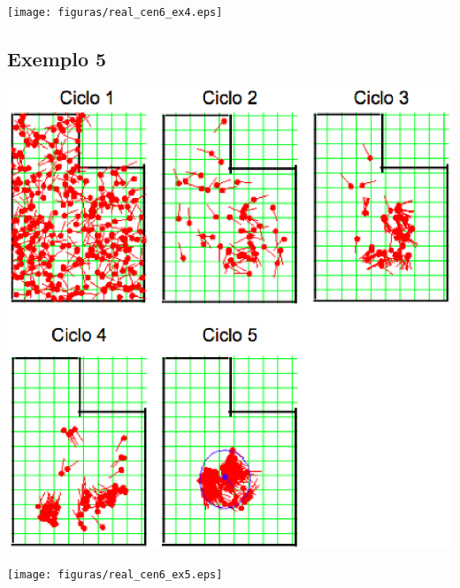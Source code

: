 {\centering
\texttt{[image: figuras/real\_cen6\_ex4.eps]}
\label{img:real_cen6_ex4}
\par}

\subsection{Exemplo 5}

{\centering
\includegraphics[scale=0.4]{figuras/cen6_ex5.eps}
\label{img:cen6_ex5}
\par}

{\centering
\texttt{[image: figuras/real\_cen6\_ex5.eps]}
\label{img:real_cen6_ex5}
\par}
